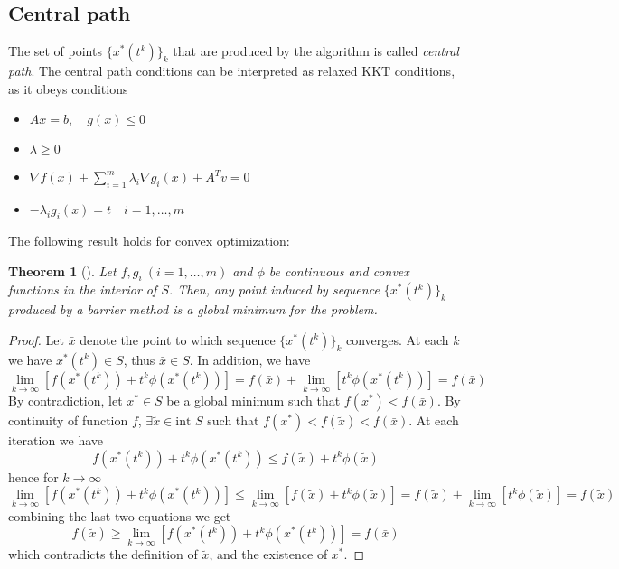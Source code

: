 \documentclass{book}
\theoremstyle{theoremv2}
\newtheorem{theorem}{Theorem}[chapter]
\theoremstyle{defv2}
\theoremstyle{remark}
\theoremstyle{remark}
\begin{document}
\subsection{Central path}
The set of points $\{x^*(t^k)\}_k$ that are produced by the algorithm is called \emph{central path}. The central path conditions can be interpreted as relaxed KKT conditions, as it obeys conditions 
\begin{itemize}
    \item $Ax=b,\quad g(x)\leq 0$
    \item $\lambda\geq 0$
    \item $\nabla f(x) + \displaystyle\sum_{i=1}^{m}\lambda_i\nabla g_i(x) + A^Tv = 0$
    \item $-\lambda_i g_i(x) = t\quad i=1,\dots,m$
\end{itemize}
The following result holds for convex optimization:
\begin{theorem}[]
    Let $f,g_i\ (i=1,\dots,m)$ and $\phi$ be continuous and convex functions in the interior of $S$. Then, any point induced by sequence $\{x^*(t^k)\}_k$ produced by a barrier method is a global minimum for the problem.
\end{theorem}
\begin{proof}
    Let $\bar{x}$ denote the point to which sequence $\{x^*(t^k)\}_k$ converges. At each $k$ we have $x^*(t^k)\in S$, thus $\bar{x}\in S$. In addition, we have 
    \[
        \lim_{k\to\infty}\left[f(x^*(t^k))+t^k\phi(x^*(t^k))\right] = f(\bar{x}) + \lim_{k\to\infty}\left[t^k\phi(x^*(t^k))\right] = f(\bar{x})
    \]
    By contradiction, let $x^*\in S$ be a global minimum such that $f(x^*)<f(\bar{x})$. By continuity of function $f$, $\exists \tilde{x}\in \text{int } S$ such that $f(x^*)<f(\tilde{x})<f(\bar{x})$. At each iteration we have 
    \[
        f(x^*(t^k)) + t^k\phi(x^*(t^k))\leq f(\tilde{x})+t^k\phi(\tilde{x})
    \]
    hence for $k\to\infty$ 
    \[
        \lim_{k\to\infty}[f(x^*(t^k))+t^k\phi(x^*(t^k))]\leq \lim_{k\to\infty}[f(\tilde{x}) +t^k \phi(\tilde{x})] = f(\tilde{x}) + \lim_{k\to\infty}[t^k\phi(\tilde{x})] = f(\tilde{x})
    \]
    combining the last two equations we get 
    \[
        f(\tilde{x}) \geq \lim_{k\to\infty}[f(x^*(t^k))+t^k\phi(x^*(t^k))] = f(\bar{x})
    \]
    which contradicts the definition of $\tilde{x}$, and the existence of $x^*$.
\end{proof}
\end{document}
